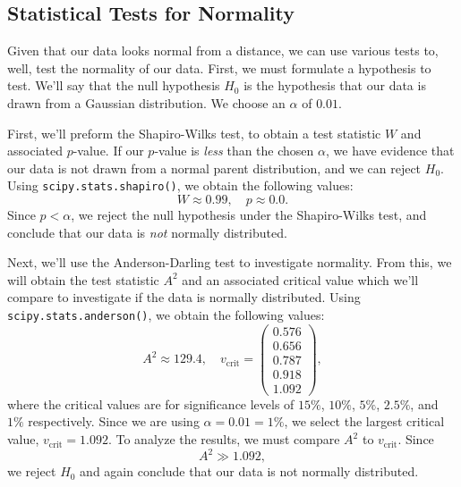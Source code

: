 \subsection*{Statistical Tests for Normality}
Given that our data looks normal from a distance, we can use various tests to, well, test the normality of our data. First, we must formulate a hypothesis to test. We'll say that the null hypothesis $H_0$ is the hypothesis that our data is drawn from a Gaussian distribution. We choose an $\alpha$ of $0.01$.

First, we'll preform the Shapiro-Wilks test, to obtain a test statistic $W$ and associated $p$-value. If our $p$-value is \emph{less} than the chosen $\alpha$, we have evidence that our data is not drawn from a normal parent distribution, and we can reject $H_0$. Using \texttt{scipy.stats.shapiro()}, we obtain the following values:
\[ W \approx 0.99,\quad p \approx 0.0. \]
Since $p < \alpha$, we reject the null hypothesis under the Shapiro-Wilks test, and conclude that our data is \emph{not} normally distributed.

Next, we'll use the Anderson-Darling test to investigate normality. From this, we will obtain the test statistic $A^2$ and an associated critical value which we'll compare to investigate if the data is normally distributed. Using \texttt{scipy.stats.anderson()}, we obtain the following values:
\[ A^2 \approx 129.4, \quad v_\text{crit} = \begin{pmatrix}
	0.576 \\ 0.656 \\ 0.787 \\ 0.918 \\ 1.092
\end{pmatrix}, \]
where the critical values are for significance levels of $15\%$, $10\%$, $5\%$, $2.5\%$, and $1\%$ respectively. Since we are using $\alpha = 0.01 = 1\%$, we select the largest critical value, $v_\text{crit} = 1.092$. To analyze the results, we must compare $A^2$ to $v_\text{crit}$. Since
\[ A^2 \gg 1.092, \]
we reject $H_0$ and again conclude that our data is not normally distributed.


